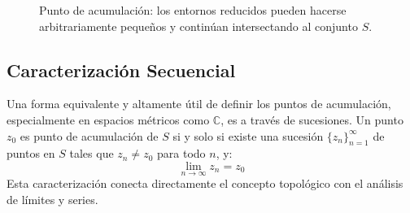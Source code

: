 \documentclass[a4paper]{article}
\begin{document}
\begin{figure}[H]
\caption{Punto de acumulación: los entornos reducidos pueden hacerse arbitrariamente pequeños y continúan intersectando al conjunto $S$.}
\end{figure}

\subsection*{Caracterización Secuencial}
Una forma equivalente y altamente útil de definir los puntos de acumulación, especialmente en espacios métricos como $\mathbb{C}$, es a través de sucesiones. Un punto $z_0$ es punto de acumulación de $S$ si y solo si existe una sucesión $\{z_n\}_{n=1}^{\infty}$ de puntos en $S$ tales que $z_n \neq z_0$ para todo $n$, y:
$$ \lim_{n \to \infty} z_n = z_0 $$
Esta caracterización conecta directamente el concepto topológico con el análisis de límites y series.
\end{document}
